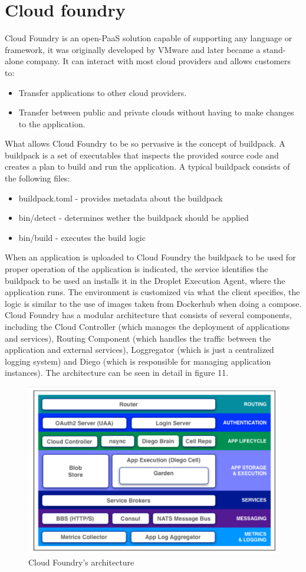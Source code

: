 \section{Cloud foundry}
Cloud Foundry is an open-PaaS solution capable of supporting any language or framework, it was originally developed by VMware and later became a stand-alone company. It can interact with most cloud providers and allows customers to:
\begin{itemize}
    \item Transfer applications to other cloud providers.
    \item Transfer between public and private clouds without having to make changes to the application.
\end{itemize}
What allows Cloud Foundry to be so pervasive is the concept of buildpack. \n
A buildpack is a set of executables that inspects the provided source code and creates a plan to build and run the application. A typical buildpack consists of the following files:
\begin{itemize}
    \item \textsf{buildpack.toml} - provides metadata about the buildpack
    \item \textsf{bin/detect} - determines wether the buildpack should be applied
    \item \textsf{bin/build} - executes the build logic
\end{itemize}
When an application is uploaded to Cloud Foundry the buildpack to be used for proper operation of the application is indicated, the service identifies the buildpack to be used an installs it in the Droplet Execution Agent, where the application runs. \n
The environment is customized via what the client specifies, the logic is similar to the use of images taken from Dockerhub when doing a compose. \n
Cloud Foundry has a modular architecture that consists of several components, including the Cloud Controller (which manages the deployment of applications and services), Routing Component (which handles the traffic between the application and external services), Loggregator (which is just a centralized logging system) and Diego (which is responsible for managing application instances). The architecture can be seen in detail in figure 11.
\begin{figure}
    \centering
    \includegraphics[scale=0.5]{./Images/Cloud_Foundry.png}
    \caption{Cloud Foundry's architecture}
\end{figure}
